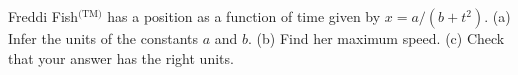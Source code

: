 Freddi Fish$^\text{(TM)}$ has a position as a function of time given by
$x=a/(b+t^2)$. (a) Infer the units of the constants $a$ and $b$.
(b) Find her maximum speed. (c) Check that your answer has the right units.
\answercheck
